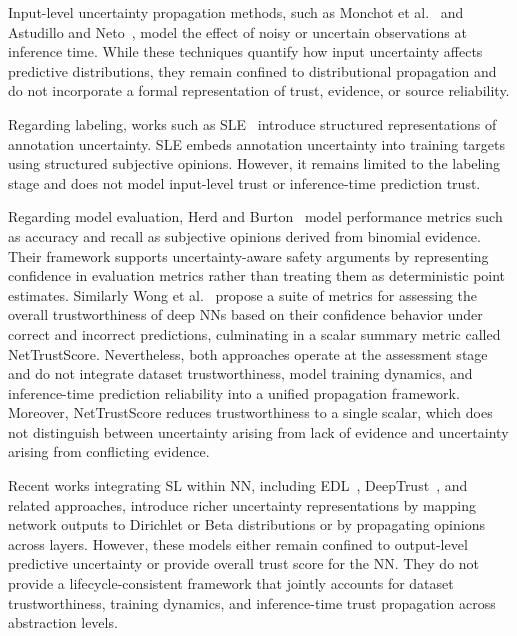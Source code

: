 Input-level uncertainty propagation methods, such as Monchot et al.~\cite{pmlr-v202-monchot23a} and Astudillo and Neto~\cite{astudillo2011propagation}, model the effect of noisy or uncertain observations at inference time. While these techniques quantify how input uncertainty affects predictive distributions, they remain confined to distributional propagation and do not incorporate a formal representation of trust, evidence, or source reliability.

Regarding labeling, works such as \ac{SLE}~\cite{SLencodings} introduce structured representations of annotation uncertainty. \ac{SLE} embeds annotation uncertainty into training targets using structured subjective opinions. However, it remains limited to the labeling stage and does not model input-level trust or inference-time prediction trust.

Regarding model evaluation, Herd and Burton~\cite{10.1145/3605098.3635966} model performance metrics such as accuracy and recall as subjective opinions derived from binomial evidence. Their framework supports uncertainty-aware safety arguments by representing confidence in evaluation metrics rather than treating them as deterministic point estimates. Similarly Wong et al.~\cite{wong2021reallytrustyousimple} propose a suite of metrics for assessing the overall trustworthiness of deep \acp{NN} based on their confidence behavior under correct and incorrect predictions, culminating in a scalar summary metric called NetTrustScore. Nevertheless, both approaches operate at the assessment stage and do not integrate dataset trustworthiness, model training dynamics, and inference-time prediction reliability into a unified propagation framework. Moreover, NetTrustScore reduces trustworthiness to a single scalar, which does not distinguish between uncertainty arising from lack of evidence and uncertainty arising from conflicting evidence.

Recent works integrating \ac{SL} within \ac{NN}, including \ac{EDL}~\cite{sensoy2018evidentialdeeplearningquantify}, DeepTrust~\cite{10.3389/frai.2020.00054}, and related approaches, introduce richer uncertainty representations by mapping network outputs to Dirichlet or Beta distributions or by propagating opinions across layers. However, these models either remain confined to output-level predictive uncertainty or provide overall trust score for the \ac{NN}. They do not provide a lifecycle-consistent framework that jointly accounts for dataset trustworthiness, training dynamics, and inference-time trust propagation across abstraction levels.

